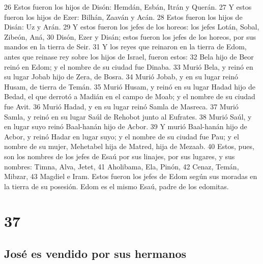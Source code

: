 26 Estos fueron los hijos de Disón: Hemdán, Esbán, Itrán y Querán.
27 Y estos fueron los hijos de Ezer: Bilhán, Zaaván y Acán.
28 Estos fueron los hijos de Disán: Uz y Arán.
29 Y estos fueron los jefes de los horeos: los jefes Lotán, Sobal, Zibeón, Aná,
30 Disón, Ezer y Disán; estos fueron los jefes de los horeos, por sus mandos en la tierra de Seir.
31 Y los reyes que reinaron en la tierra de Edom, antes que reinase rey sobre los hijos de Israel, fueron estos:
32 Bela hijo de Beor reinó en Edom; y el nombre de su ciudad fue Dinaba.
33 Murió Bela, y reinó en su lugar Jobab hijo de Zera, de Bosra.
34 Murió Jobab, y en su lugar reinó Husam, de tierra de Temán.
35 Murió Husam, y reinó en su lugar Hadad hijo de Bedad, el que derrotó a Madián en el campo de Moab; y el nombre de su ciudad fue Avit.
36 Murió Hadad, y en su lugar reinó Samla de Masreca.
37 Murió Samla, y reinó en su lugar Saúl de Rehobot junto al Eufrates.
38 Murió Saúl, y en lugar suyo reinó Baal-hanán hijo de Acbor.
39 Y murió Baal-hanán hijo de Acbor, y reinó Hadar en lugar suyo; y el nombre de su ciudad fue Pau; y el nombre de su mujer, Mehetabel hija de Matred, hija de Mezaab.
40 Estos, pues, son los nombres de los jefes de Esaú por sus linajes, por sus lugares, y sus nombres: Timna, Alva, Jetet,
41 Aholibama, Ela, Pinón,
42 Cenaz, Temán, Mibzar,
43 Magdiel e Iram. Estos fueron los jefes de Edom según sus moradas en la tierra de su posesión. Edom es el mismo Esaú, padre de los edomitas.

\chapter{37}

\section{José es vendido por sus hermanos}

